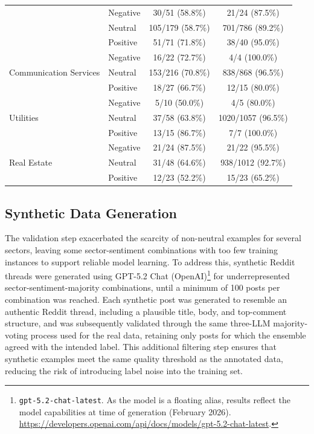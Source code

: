 \begin{table}[ht]
\begin{tabular}{|l|l|c|c|}
& Negative & 30/51 (58.8\%) & 21/24 (87.5\%) \\
& Neutral  & 105/179 (58.7\%) & 701/786 (89.2\%) \\
& Positive & 51/71 (71.8\%) & 38/40 (95.0\%) \\
\hline
\multirow{3}{*}{Communication Services}
& Negative & 16/22 (72.7\%) & 4/4 (100.0\%) \\
& Neutral  & 153/216 (70.8\%) & 838/868 (96.5\%) \\
& Positive & 18/27 (66.7\%) & 12/15 (80.0\%) \\
\hline
\multirow{3}{*}{Utilities}
& Negative & 5/10 (50.0\%) & 4/5 (80.0\%) \\
& Neutral  & 37/58 (63.8\%) & 1020/1057 (96.5\%) \\
& Positive & 13/15 (86.7\%) & 7/7 (100.0\%) \\
\hline
\multirow{3}{*}{Real Estate}
& Negative & 21/24 (87.5\%) & 21/22 (95.5\%) \\
& Neutral  & 31/48 (64.6\%) & 938/1012 (92.7\%) \\
& Positive & 12/23 (52.2\%) & 15/23 (65.2\%) \\
\hline
\end{tabular}
\end{table}

\subsection{Synthetic Data Generation}
\label{sec:redditsynthetic_data}

The validation step exacerbated the scarcity of non-neutral examples for several sectors, leaving some sector-sentiment combinations with too few training instances to support reliable model learning. To address this, synthetic Reddit threads were generated using GPT-5.2 Chat (OpenAI)\footnote{\texttt{gpt-5.2-chat-latest}. As the model is a floating alias, results reflect the model capabilities at time of generation (February 2026). \url{https://developers.openai.com/api/docs/models/gpt-5.2-chat-latest}.} for underrepresented sector-sentiment-majority combinations, until a minimum of 100 posts per combination was reached. Each synthetic post was generated to resemble an authentic Reddit thread, including a plausible title, body, and top-comment structure, and was subsequently validated through the same three-LLM majority-voting process used for the real data, retaining only posts for which the ensemble agreed with the intended label. This additional filtering step ensures that synthetic examples meet the same quality threshold as the annotated data, reducing the risk of introducing label noise into the training set.

